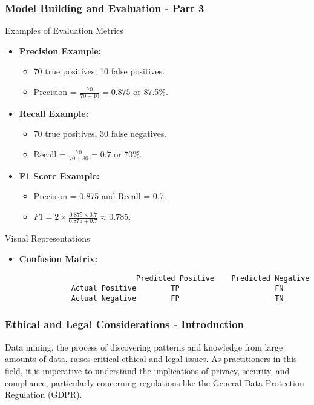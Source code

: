 \documentclass{beamer}
\begin{document}
\begin{frame}[fragile]
    \frametitle{Model Building and Evaluation - Part 3}
    \begin{block}{Examples of Evaluation Metrics}
        \begin{itemize}
            \item \textbf{Precision Example:}
            \begin{itemize}
                \item 70 true positives, 10 false positives. 
                \item Precision = $\frac{70}{70 + 10} = 0.875$ or 87.5\%.
            \end{itemize}
            \item \textbf{Recall Example:}
            \begin{itemize}
                \item 70 true positives, 30 false negatives.
                \item Recall = $\frac{70}{70 + 30} = 0.7$ or 70\%.
            \end{itemize}
            \item \textbf{F1 Score Example:} 
            \begin{itemize}
                \item Precision = 0.875 and Recall = 0.7.
                \item $F1 = 2 \times \frac{0.875 \times 0.7}{0.875 + 0.7} \approx 0.785$.
            \end{itemize}
        \end{itemize}
    \end{block}

    \begin{block}{Visual Representations}
        \begin{itemize}
            \item \textbf{Confusion Matrix:}
            \begin{lstlisting}
                           Predicted Positive    Predicted Negative
            Actual Positive        TP                      FN
            Actual Negative        FP                      TN
            \end{lstlisting}
        \end{itemize}
    \end{block}
\end{frame}

\begin{frame}[fragile]
    \frametitle{Ethical and Legal Considerations - Introduction}
    Data mining, the process of discovering patterns and knowledge from large amounts of data, raises critical ethical and legal issues. As practitioners in this field, it is imperative to understand the implications of privacy, security, and compliance, particularly concerning regulations like the General Data Protection Regulation (GDPR).
\end{frame}
\end{document}
